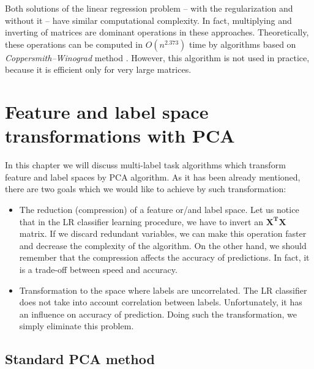 Both solutions of the linear regression problem -- with the regularization and without it -- have similar computational complexity. In fact, multiplying and inverting of matrices are dominant operations in these approaches. Theoretically, these operations can be computed in $O(n^{2.373})$ time by algorithms based on \textit{Coppersmith–Winograd} method \citep{VVW}. However, this algorithm is not used in practice, because it is efficient only for very large matrices.

\section{Feature and label space transformations with PCA}

In this chapter we will discuss multi-label task algorithms which transform feature and label spaces by PCA algorithm. As it has been already mentioned, there are two goals which we would like to achieve by such transformation:
\begin{itemize}
    \item The reduction (compression) of a feature or/and label space. Let us notice that in the LR classifier learning procedure, we have to invert an $\boldsymbol{X^T}\boldsymbol{X}$ matrix. If we discard redundant variables, we can make this operation faster and decrease the complexity of the algorithm. On the other hand, we should remember that the compression affects the accuracy of predictions. In fact, it is a trade-off between speed and accuracy.
    \item Transformation to the space where labels are uncorrelated. The LR classifier does not take into account correlation between labels. Unfortunately, it has an influence on accuracy of prediction. Doing such the transformation, we simply eliminate this problem. 
\end{itemize}

\subsection{Standard PCA method}\label{sec:pca}

